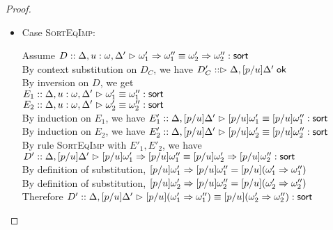 \begin{proof}
\begin{itemize}
\item Case \textsc{SortEqImp}: 
  \begin{tabbedproof}
    \oo Assume $D :: \judgeSortEq[{\Delta, u:\omega, \Delta'}]{\omega'_1 \To \omega''_1}{\omega'_2 \To \omega''_2}$\\
    \ooo By context substitution on $D_C$, we have $D'_C :: \judgeACtx{\Delta, [p/u]\Delta'}$ \\
    \ooo By inversion on $D$, we get \\
    \oooo $E_1 :: \judgeSortEq[{\Delta, u:\omega, \Delta'}]{\omega'_1}{\omega''_1}$\\
    \oooo $E_2 :: \judgeSortEq[{\Delta, u:\omega, \Delta'}]{\omega'_2}{\omega''_2}$\\
    \ooo By induction on $E_1$, we have $E'_1 :: \judgeSortEq[{\Delta, [p/u]\Delta'}]{[p/u]\omega'_1}{[p/u]\omega''_1}$\\
    \ooo By induction on $E_2$, we have $E'_2 :: \judgeSortEq[{\Delta, [p/u]\Delta'}]{[p/u]\omega'_2}{[p/u]\omega''_2}$\\
    \ooo By rule \textsc{SortEqImp} with $E'_1, E'_2$, we have  \\
    \ooox $D' :: \judgeSortEq[{\Delta, [p/u]\Delta'}]{[p/u]\omega'_1 \To [p/u]\omega''_1}{[p/u]\omega'_2 \To [p/u]\omega''_2}$\\
    \ooo By definition of substitution, $[p/u]\omega'_1 \To [p/u]\omega''_1 = [p/u](\omega'_1 \To \omega''_1)$\\
    \ooo By definition of substitution, $[p/u]\omega'_2 \To [p/u]\omega''_2 = [p/u](\omega'_2 \To \omega''_2)$\\
    \ooo Therefore 
           $D' :: \judgeSortEq[{\Delta, [p/u]\Delta'}]{[p/u](\omega'_1 \To \omega''_1)}{[p/u](\omega'_2 \To \omega''_2)}$\\
  \end{tabbedproof}


\end{itemize}
\end{proof}

